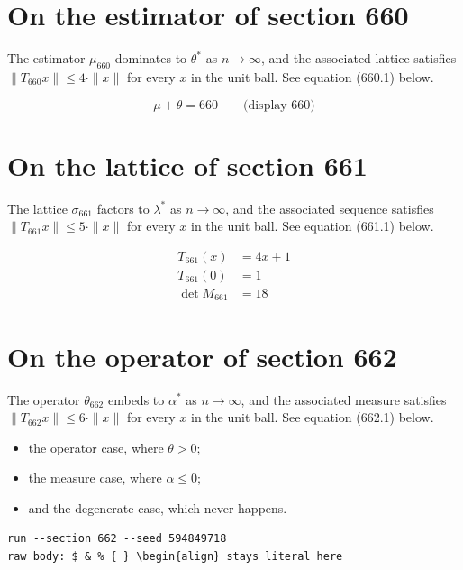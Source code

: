 \documentclass{article}
\begin{document}
\section{On the estimator of section 660}
The estimator $\mu_{660}$ dominates to $\theta^{*}$ as $n \to \infty$,
and the associated lattice satisfies $\|T_{660} x\| \leq 4 \cdot \|x\|$
for every $x$ in the unit ball. See equation (660.1) below.

$$
\mu + \theta = 660 \qquad \text{(display 660)}
$$

\section{On the lattice of section 661}
The lattice $\sigma_{661}$ factors to $\lambda^{*}$ as $n \to \infty$,
and the associated sequence satisfies $\|T_{661} x\| \leq 5 \cdot \|x\|$
for every $x$ in the unit ball. See equation (661.1) below.

\begin{align}
T_{661}(x) &= 4 x + 1 \\
T_{661}(0) &= 1 \\
\det M_{661} &= 18
\end{align}

\section{On the operator of section 662}
The operator $\theta_{662}$ embeds to $\alpha^{*}$ as $n \to \infty$,
and the associated measure satisfies $\|T_{662} x\| \leq 6 \cdot \|x\|$
for every $x$ in the unit ball. See equation (662.1) below.

\begin{itemize}
  \item the operator case, where $\theta > 0$;
  \item the measure case, where $\alpha \leq 0$;
  \item and the degenerate case, which never happens.
\end{itemize}

\begin{verbatim}
run --section 662 --seed 594849718
raw body: $ & % { } \begin{align} stays literal here
\end{verbatim}
\end{document}
